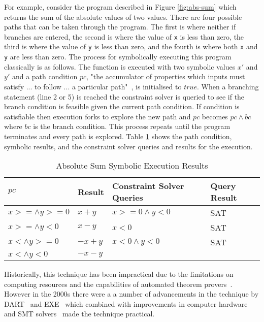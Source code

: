 \documentclass[]{final_report}
\begin{document}
For example, consider the program described in Figure \ref{fig:abs-sum} which returns the sum of the absolute values of two values. There are four possible paths that can be taken through the program. The first is where neither if branches are entered, the second is where the value of \lstinline{x} is less than zero, the third is where the value of \lstinline{y} is less than zero, and the fourth is where both \lstinline{x} and \lstinline{y} are less than zero. The process for symbolically executing this program classically is as follows. The function is executed with two symbolic values $x'$ and $y'$ and a path condition $pc$, "the accumulator of properties which inputs must satisfy ... to follow ... a particular path"~\cite{king1976symbolic}, is initialised to $true$. When a branching statement (line 2 or 5) is reached the constraint solver is queried to see if the branch condition is feasible given the current path condition. If condition is satisfiable then execution forks to explore the new path and $pc$ becomes $pc \land bc$ where $bc$ is the branch condition. This process repeats until the program terminates and every path is explored. Table \ref{abs-sum-se-table} shows the path condition, symbolic results, and the constraint solver queries and results for the execution.

\begin{table}[]
\centering
\begin{tabular}{|l|l|l|l|}
\hline
$pc$                & Result  & Constraint Solver Queries & Query Result \\ \hline
$x >= \land y >= 0$ & $x+y$   & $x >=0 \land y < 0 $      & SAT          \\ \hline
$x >= \land y < 0$  & $x - y$ & $x <0 $                   & SAT          \\ \hline
$x < \land y >= 0$  & $-x+y$  & $x<0 \land y < 0 $        & SAT          \\ \hline
$x < \land y < 0$   & $-x-y$  &                           &              \\ \hline
\end{tabular}
\caption{Absolute Sum Symbolic Execution Results}
\label{abs-sum-se-table}
\end{table}

Historically, this technique has been impractical due to the limitations on computing resources and the capabilities of automated theorem provers~\cite{king1976symbolic}. However in the 2000s there were a a number of advancements in the technique by DART~\cite{godefroid2005dart} and EXE~\cite{cadar2008exe} which combined with improvements in computer hardware and SMT solvers~\cite{de2011satisfiability} made the technique practical.
\end{document}
